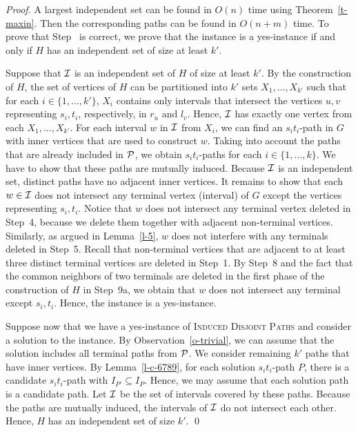 \documentclass{llncs}
\newcommand{\problemIDP}{\textsc{Induced Disjoint Paths}}
\begin{document}
\begin{proof}
A largest independent set can be found in $O(n)$ time using Theorem~\ref{t-maxin}. Then the corresponding paths can be found in $O(n+m)$ time. To prove that Step~\sten{} is correct, we prove that the instance is a yes-instance if and only if $H$ has an independent set of size at least $k'$.

Suppose that $\cal I$ is an independent set of $H$ of size at least $k'$. By the construction of $H$, the set of vertices of $H$ can be partitioned into $k'$ sets $X_1,\ldots,X_{k'}$ such that for each $i\in\{1,\ldots,k'\}$, $X_i$ contains only intervals that intersect the vertices $u,v$ representing $s_i,t_i$, respectively, in $r_u$ and $l_v$. Hence, $\cal I$ has exactly one vertex from each $X_1,\ldots,X_{k'}$.   
For each interval $w$ in $\cal I$ from $X_i$, we can find an $s_it_i$-path in $G$ with inner vertices that are used to construct $w$. Taking into account the paths that are already included in $\cal P$, we obtain $s_it_i$-paths for each $i\in\{1,\ldots,k\}$.  We have to show that these paths are mutually induced. Because $\cal I$ is an independent set, distinct paths 
have no adjacent inner vertices. It remains to show that each $w\in {\cal I}$ does not intersect any terminal vertex (interval) of $G$ except the vertices representing $s_i,t_i$.
 Notice that $w$ does not intersect any terminal vertex deleted in Step~4, because we delete them together with adjacent non-terminal vertices. Similarly, as argued in Lemma~\ref{l-5}, $w$ does not interfere with any terminals deleted in Step~5.
Recall that non-terminal vertices that are adjacent  to at least three distinct terminal vertices are deleted in Step~1. By Step~8 and the fact that the common neighbors of two terminals are deleted in the first phase of the construction of $H$ in Step~9a, we obtain that $w$ does not intersect any terminal except $s_i,t_i$. Hence, the instance is a yes-instance.

Suppose now that we have a yes-instance of \problemIDP{} and consider a solution to the instance. By Observation~\ref{o-trivial}, we can assume that the solution includes all terminal paths from $\cal P$. We consider remaining $k'$ paths that have inner vertices. By Lemma~\ref{l-c-6789}, for each solution $s_it_i$-path $P$, there is a candidate $s_it_i$-path with $I_{P'} \subseteq I_{P}$. Hence, we may assume that each solution path is a candidate path. 
Let $\cal I$ be the set of intervals covered by these paths.
Because the paths are mutually induced, the intervals of $\cal I$ do not intersect each other. Hence, $H$ has an independent set of size $k'$.
\qed
\end{proof}
\end{document}
